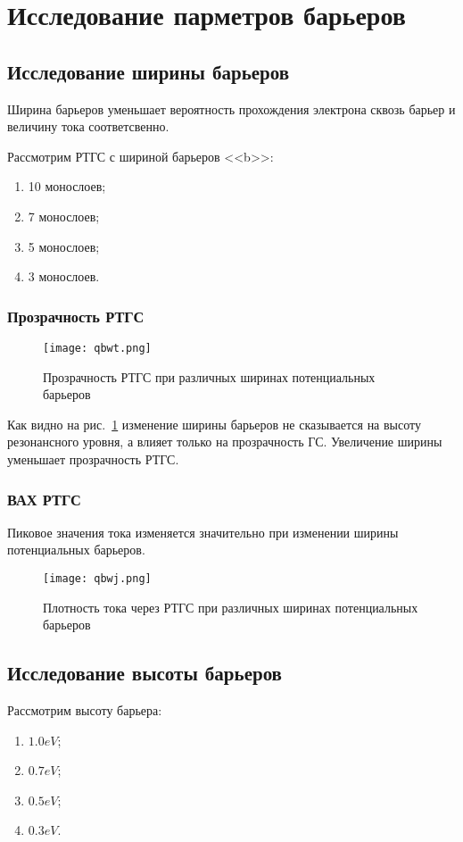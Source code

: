 \section{Исследование парметров барьеров}

\subsection{Исследование ширины барьеров}
Ширина барьеров уменьшает вероятность прохождения электрона сквозь барьер и величину тока соответсвенно. 

Рассмотрим РТГС с шириной барьеров <<b>>:
\begin{enumerate}
	\item 10 монослоев;
	\item 7 монослоев;
	\item 5 монослоев;
	\item 3 монослоев.
\end{enumerate}

\subsubsection{Прозрачность РТГС}
\begin{figure}[h!]
	\centering
	\texttt{[image: qbwt.png]}
	\caption{Прозрачность РТГС при различных ширинах потенциальных барьеров}
	\label{fig:qbwt}
\end{figure}

Как видно на рис.~\ref{fig:qbwt} изменение ширины барьеров не сказывается на высоту резонансного уровня, а влияет только на прозрачность ГС. Увеличение ширины уменьшает прозрачность РТГС.

\subsubsection{ВАХ РТГС}
Пиковое значения тока изменяется значительно при изменении ширины потенциальных барьеров.
\begin{figure}[h!]
	\centering
	\texttt{[image: qbwj.png]}
	\caption{Плотность тока через РТГС при различных ширинах потенциальных барьеров}
	\label{fig:qbwj}
\end{figure}

\subsection{Исследование высоты барьеров}
Рассмотрим высоту барьера:
\begin{enumerate}
	\item $1.0 eV$;
	\item $0.7 eV$;
	\item $0.5 eV$;
	\item $0.3 eV$.
\end{enumerate}

